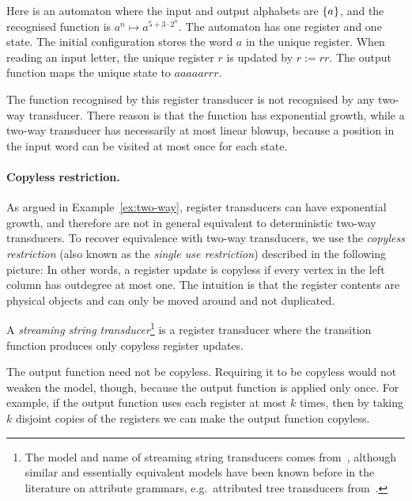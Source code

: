 \begin{example}\label{ex:two-way}
	Here is an automaton where the input and output alphabets are $\{a\}$, and the recognised function is $a^n \mapsto a^{5+ 3 \cdot 2^n}$. The automaton has one register and one state. The initial configuration stores the word $a$ in the unique register. When reading an input letter, the unique register $r$ is updated by
$r:=rr$. The output function maps the unique state to  $aaaaarrr$.  

The function recognised by this register transducer  is not recognised by  any two-way transducer. There reason is that the function has exponential growth, while a two-way transducer has necessarily at most linear blowup, because a position 
in the input word can be visited at most once for each state. 
\end{example}

\paragraph*{Copyless restriction.} As argued in Example~\ref{ex:two-way},  register transducers can have exponential growth, and therefore are not in general equivalent to  deterministic two-way transducers.  
 To recover equivalence with two-way transducers, we use the   \emph{copyless restriction} (also known as the \emph{single use restriction}) described in the following picture:
In other words, a register  update is copyless if every  vertex in the left column has outdegree at most one.  
The intuition is that the register contents are physical objects and can only be moved around and not duplicated.

\begin{definition}
	A \emph{streaming string transducer}\footnote{The model and name of streaming string transducers comes from~\cite{Alur:2010gc}, although similar and essentially equivalent models have been known before in the literature on attribute grammars, e.g.~attributed tree transducers from~\cite{:1981vj}.
} is a register transducer where the transition function produces only  copyless register updates.  
\end{definition}

 The output function need not be copyless.   Requiring it to be copyless would not weaken the model, though, because the output function is applied only once. For example, if the output function  uses each register at most $k$ times, then by taking $k$ disjoint copies of the registers we can make the output function copyless.

